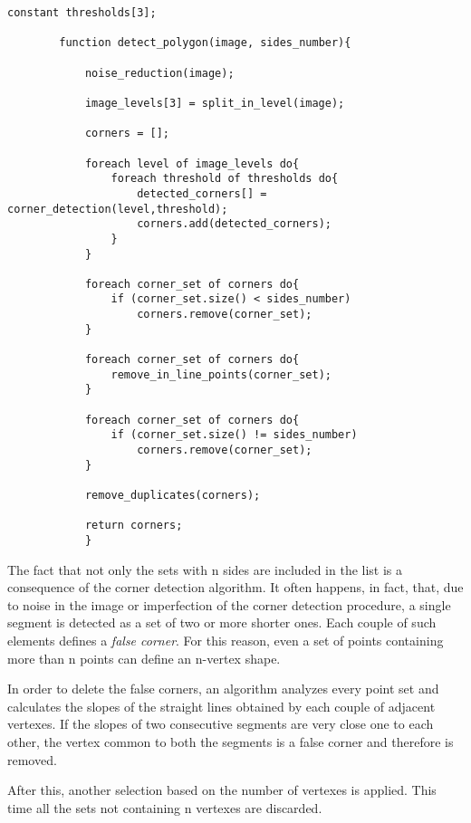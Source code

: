	    	\begin{lstlisting}constant thresholds[3];	

		function detect_polygon(image, sides_number){

			noise_reduction(image);
		
			image_levels[3] = split_in_level(image);
		
			corners = [];
	
			foreach level of image_levels do{
				foreach threshold of thresholds do{
					detected_corners[] = corner_detection(level,threshold);
					corners.add(detected_corners);
				}
			}	
		
			foreach corner_set of corners do{
				if (corner_set.size() < sides_number)
					corners.remove(corner_set);
			}			

			foreach corner_set of corners do{
				remove_in_line_points(corner_set);
			}

			foreach corner_set of corners do{
				if (corner_set.size() != sides_number)
					corners.remove(corner_set);
			}

			remove_duplicates(corners);	
		
			return corners;
			}
		\end{lstlisting}

		The fact that not only the sets with n sides are included in the list is a consequence of the corner detection algorithm. 
		It often happens, in fact, that, due to noise in the image or imperfection of the corner detection procedure, a single segment is detected as a set of two or more shorter ones. 
		Each couple of such elements defines a \emph{false corner}. 
		For this reason, even a set of points containing more than n points can define an n-vertex shape. 


		In order to delete the false corners, an algorithm analyzes every point set and calculates the slopes of the straight lines obtained by each couple of adjacent vertexes. 
		If the slopes of two consecutive segments are very close one to each other, the vertex common to both the segments is a false corner and therefore is removed.
		

		
		After this, another selection based on the number of vertexes is applied. This time all the sets not containing n vertexes are discarded.

